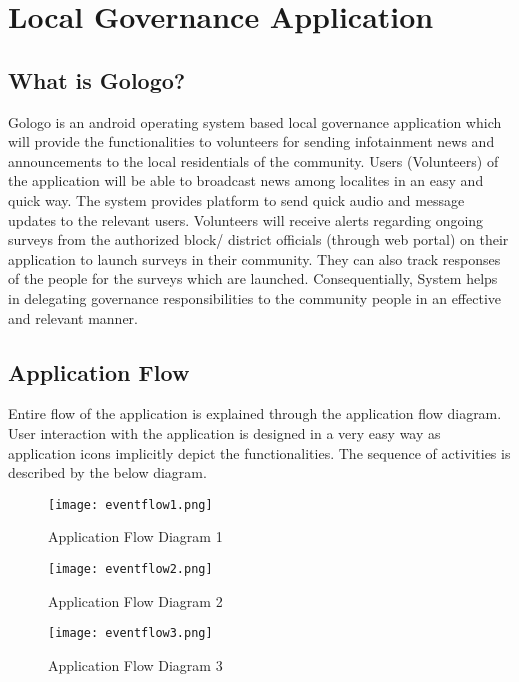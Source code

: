 \chapter {Local Governance Application}

\section{What is Gologo?}

Gologo is an android operating system based local governance application which will provide the functionalities to volunteers for sending infotainment news and announcements to the local residentials of the community. Users (Volunteers) of the application will be able to broadcast news among localites in an easy and quick way.  The system provides platform to send quick audio and message updates to the relevant users. Volunteers will receive alerts regarding ongoing surveys from the authorized block/ district officials (through web portal)  on their application to launch surveys in their community. They can also track responses of the people for the surveys which are launched. Consequentially, System helps in delegating governance responsibilities to the community people in an effective and relevant manner.

\section{Application Flow}
 Entire flow of the application is explained through the application flow diagram. User interaction with the application is designed in a  very easy way as application icons implicitly depict the functionalities. The sequence of activities is described by the below diagram.

\begin{figure}[H]
    \centering
	\texttt{[image: eventflow1.png]}
    \caption{ Application Flow Diagram 1}
    \label{fig:Application Flow Diagram 1}
\end{figure} 

\begin{figure}[H]
    \centering
	\texttt{[image: eventflow2.png]}
    \caption{ Application Flow Diagram 2}
    \label{fig:Application Flow Diagram 2}
\end{figure} 

\begin{figure}[H]
    \centering
	\texttt{[image: eventflow3.png]}
    \caption{ Application Flow Diagram 3}
    \label{fig:Application Flow Diagram 3}
\end{figure} 

